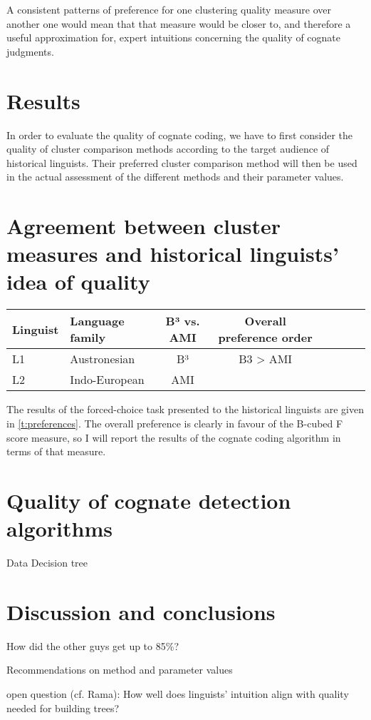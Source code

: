 \documentclass[a4paper,11pt,twocolumn]{scrartcl}
\begin{document}
A consistent patterns of preference for one clustering quality measure over
another one would mean that that measure would be closer to, and therefore a
useful approximation for, expert intuitions concerning the quality of cognate
judgments.

\section{Results}
\label{results}
In order to evaluate the quality of cognate coding, we have to first consider
the quality of cluster comparison methods according to the target audience of
historical linguists. Their preferred cluster comparison method will then be
used in the actual assessment of the different methods and their parameter
values.

\section{Agreement between cluster measures and historical linguists' idea of
  quality}
\label{measures}
\begin{table*}
  \begin{tabular}{llcccccc}
    Linguist & Language family & B³ vs. AMI & Overall preference order \\
    \hline
    L1 & Austronesian & B³ & B3 > AMI \\
    L2 & Indo-European & AMI & \\
    \hline
  \end{tabular}
  \caption{Preferences in the forced choice task, for the sample of historical linguists}
  \label{t:preferences}
\end{table*}
The results of the forced-choice task presented to the historical linguists are
given in \cref{t:preferences}. The overall preference is clearly in favour of
the B-cubed F score measure, so I will report the results of the cognate coding
algorithm in terms of that measure.

\section{Quality of cognate detection algorithms}
\label{clusterquality}
Data
Decision tree

\section{Discussion and conclusions}
\label{discussion}

How did the other guys get up to 85\%?

Recommendations on method and parameter values

open question (cf. Rama): How well does linguists' intuition align with quality
needed for building trees?

\printbibliography
\end{document}
